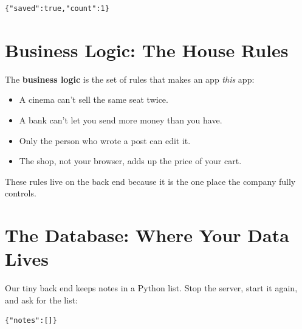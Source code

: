 \begin{codeblock}
\begin{Verbatim}[formatcom=\outputstyle]
{"saved":true,"count":1}
\end{Verbatim}
\end{codeblock}

\section{Business Logic: The House Rules}\label{03-the-back-end:business-logic-the-house-rules}

The \textbf{business logic} is the set of rules that makes an app \emph{this} app:

\begin{itemize}
\tightlist
\item
  A cinema can't sell the same seat twice.
\item
  A bank can't let you send more money than you have.
\item
  Only the person who wrote a post can edit it.
\item
  The shop, not your browser, adds up the price of your cart.
\end{itemize}

These rules live on the back end because it is the one place the company fully controls.


\section{The Database: Where Your Data Lives}\label{03-the-back-end:the-database-where-your-data-lives}

Our tiny back end keeps notes in a Python list. Stop the server, start it again, and ask for the list:

\begin{codeblock}

\begin{Shaded}
\begin{Highlighting}[]
\end{Highlighting}
\end{Shaded}

\end{codeblock}

\begin{codeblock}
\begin{Verbatim}[formatcom=\outputstyle]
{"notes":[]}
\end{Verbatim}
\end{codeblock}

